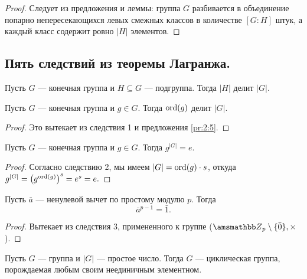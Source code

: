 \begin{proof}
  Следует из предложения и леммы: группа $G$ разбивается 
  в объединение попарно непересекающихся
  левых смежных классов в количестве $[G : H]$ штук,
   а каждый класс содержит ровно $|H|$
  элементов. 
\end{proof}

\newpage
\mysection
\subsection{Пять следствий из теоремы Лагранжа.}

\begin{corollary}[ 1]
  Пусть $G$ --- конечная группа и $H \subseteq G$ --- подгруппа. 
  Тогда $|H|$ делит $|G|$.
\end{corollary}

\begin{corollary}[ 2]
  Пусть $G$ --- конечная группа и $g \in G$. Тогда $\operatorname{ord}(g)$ делит $|G|$.
\end{corollary}

\begin{proof}
  Это вытекает из следствия 1 и предложения \ref{pr:2:5}.
\end{proof}

\begin{corollary}[ 3]
  Пусть $G$ --- конечная группа и $g \in G$. Тогда $g^{|G|} = e$.
\end{corollary}

\begin{proof}
  Согласно следствию 2, мы имеем $|G| = \operatorname{ord}(g) \cdot s$,
  откуда $g^{|G|} = \left(g^{\operatorname{ord}(g)}\right)^{s} = e^{s} = e.$
\end{proof}

\begin{corollary}
  Пусть $\bar a$ --- ненулевой вычет по простому модулю $p$. Тогда
  \[
    \bar a^{p - 1} = \bar 1.
  \]
\end{corollary}

\vspace{-0.4cm}

\begin{proof}
  Вытекает из следствия 3, примененного к группе 
  ($\ZZ_p \setminus \{\bar0\}, \times$).
\end{proof}

\begin{corollary}[ 5]
  Пусть $G$ --- группа и $|G|$ --- простое число. 
  Тогда $G$ --- циклическая группа, 
  порождаемая любым своим неединичным элементном. 
\end{corollary}

